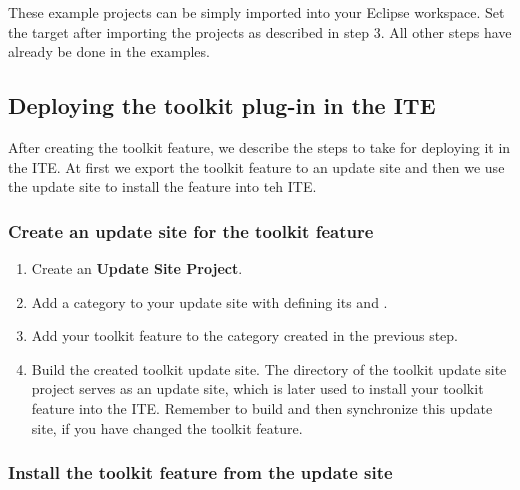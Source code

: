 These example projects can be simply imported into your Eclipse workspace. Set
the target after importing the projects as described in step 3. All other steps
have already be done in the examples.

\subsection{Deploying the toolkit plug-in in the ITE}

After creating the toolkit feature, we describe the steps to take for deploying
it in the ITE. At first we export the toolkit feature to an update
site and then we use the update site to install the feature into teh ITE.
 
\subsubsection{Create an update site for the toolkit feature}

\begin{enumerate}
\item Create an \textbf{Update Site Project}.
\item Add a category to your update site with defining its  and
      .
\item Add your toolkit feature to the category created in the previous step.
\item Build the created toolkit update site. The directory of the toolkit
      update site project serves as an update site, which is later used to
      install your toolkit feature into the ITE. Remember to build and then
      synchronize this update site, if you have changed the toolkit feature.
\end{enumerate}

\subsubsection{Install the toolkit feature from the update site}

